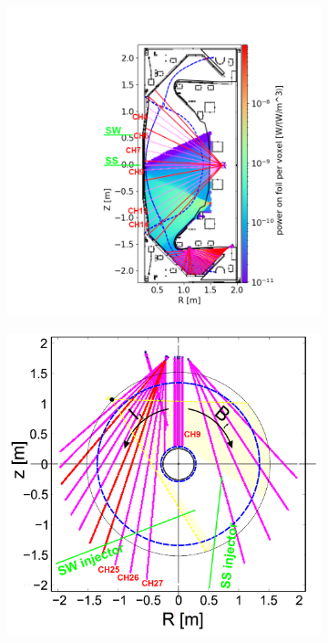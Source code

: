 \begin{figure}
     \centering
     \begin{subfigure}{0.48\linewidth}
         \centering
         \includegraphics[trim={175 20 65 60},clip,width=\textwidth]{Chapters/chapter2/figs/res_bolo5.png}
         \caption{}
         \label{fig:res_bolo1a}
     \end{subfigure}
     \begin{subfigure}{0.48\linewidth}
         \centering
         \includegraphics[trim={20 0 70 0},clip,width=\textwidth]{Chapters/chapter2/figs/res_bolo_toroidal3.png}

\end{subfigure}
\end{figure}
